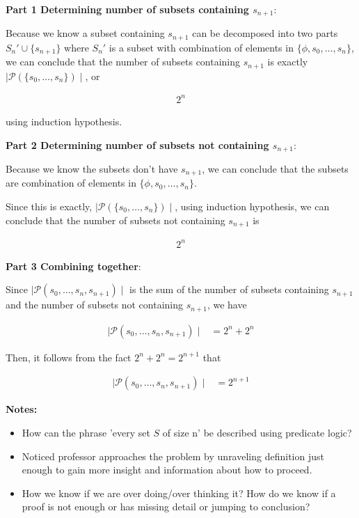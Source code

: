 \documentclass[12pt]{article}
\begin{document}
\begin{enumerate}[a.]
    \bigskip

    \textbf{Part 1 Determining number of subsets containing $s_{n+1}$}:

    Because we know a subset containing $s_{n+1}$ can be decomposed into two parts
    $S_n' \cup \{s_{n+1}\}$ where $S_n'$ is a subset with combination of elements in
    $\{\phi, s_0,\dots,s_n\}$, we can conclude that the number of subsets containing
    $s_{n+1}$ is exactly $\mid \mathcal{P}(\{s_0,\dots,s_n\}) \mid$, or

    \begin{align}
        2^n
    \end{align}

    using induction hypothesis.

    \bigskip

    \textbf{Part 2 Determining number of subsets not containing $s_{n+1}$}:

    Because we know the subsets don't have $s_{n+1}$, we can conclude that
    the subsets are combination of elements in $\{\phi, s_0,\dots,s_n\}$.

    \bigskip

    Since this is exactly, $\mid \mathcal{P}(\{s_0,\dots,s_n\}) \mid$, using induction
    hypothesis, we can conclude that the number of subsets not containing $s_{n+1}$
    is

    \begin{align}
        2^n
    \end{align}

    \bigskip

    \textbf{Part 3 Combining together}:

    Since $\mid \mathcal{P}(s_0,\dots,s_n,s_{n+1}) \mid$ is the sum of the
    number of subsets containing $s_{n+1}$ and the number of subsets not containing
    $s_{n+1}$, we have

    \begin{align}
        \mid \mathcal{P}(s_0,\dots,s_n,s_{n+1}) \mid &= 2^n + 2^n
    \end{align}

    Then, it follows from the fact $2^n + 2^n = 2^{n+1}$ that

    \begin{align}
        \mid \mathcal{P}(s_0,\dots,s_n,s_{n+1}) \mid &= 2^{n+1}
    \end{align}

    \textbf{Notes:}
    \begin{itemize}
        \item How can the phrase 'every set $S$ of size n' be described using
        predicate logic?
        \item Noticed professor approaches the problem by unraveling definition
        just enough to gain more insight and information about how to proceed.
        \item How we know if we are over doing/over thinking it? How do we know
        if a proof is not enough or has missing detail or jumping to conclusion?
    \end{itemize}

\end{enumerate}
\end{document}

